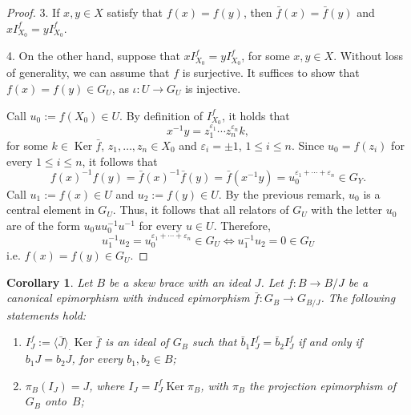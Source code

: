 \documentclass[12pt, a4paper, english]{article}
\newtheorem{corolari}[teorema]{Corollary}
\theoremstyle{definition}
\theoremstyle{remark}
\DeclareMathOperator{\Ker}{Ker}
\newcommand{\bigcdot}{\boldsymbol{\cdot}}
\begin{document}
\begin{proof}
3. If $x, y\in X$ satisfy that $f(x) = f(y)$, then $\bar{f}(x) = \bar{f}(y)$ and $xI^f_{X_0} = yI^f_{X_0}$. 

4. On the other hand, suppose that $xI^f_{X_0} = yI^f_{X_0}$, for some $x,y\in X$. Without loss of generality, we can assume that $f$ is surjective. It suffices to show that $f(x) = f(y) \in G_U$, as $\iota \colon U \rightarrow G_U$ is injective.

Call $u_0:= f(X_0) \in U$. By definition of $I^f_{X_0}$, it holds that
\[ x^{-1}y = z_1^{\varepsilon_1}\cdots z_n^{\varepsilon_n}k,\]
for some $k\in \Ker \bar{f}$, $z_1, \ldots, z_n \in X_0$ and $\varepsilon_i = \pm 1$, $1\leq i \leq n$. Since $u_0 = f(z_i)$ for every $1\leq i \leq n$, it follows that 
\[ f(x)^{-1}f(y) = \bar{f}(x)^{-1}\bar{f}(y) = \bar{f}(x^{-1}y) = u_0^{\varepsilon_1+\cdots + \varepsilon_n} \in G_Y.\]
Call $u_1 := f(x) \in U$ and $u_2 := f(y)\in U$. By the previous remark, $u_0$ is a central element in $G_U$. Thus, it follows that all relators of $G_U$ with the letter $u_0$ are of the form $u_0uu_0^{-1}u^{-1}$ for every $u\in U$. Therefore, 
\[ u_1^{-1}u_2 = u_0^{\varepsilon_1+ \cdots + \varepsilon_n} \in G_U \Leftrightarrow u_1^{-1}u_2 = 0\in G_U\]
i.e. $f(x) = f(y) \in G_U$.
\end{proof}

\begin{corolari}
\label{cor:I_J-ideal-brace}
Let $B$ be a skew brace with an ideal $J$. Let $f\colon B \rightarrow B/J$ be a canonical epimorphism with induced epimorphism $\bar{f}\colon G_B \rightarrow G_{B/J}$. The following statements hold:
\begin{enumerate}
\item $I_J^f:= \langle \bar{J} \rangle_{\bigcdot}\Ker \bar f$ is an ideal of $G_B$ such that $\bar b_1 I_J^f = \bar b_2 I_J^f$ if and only if $b_1J = b_2J$, for every $b_1,b_2\in B$;

\item $\pi_B(I_J) = J$, where $I_J = I_J^f\Ker \pi_B$, with $\pi_B$ the projection epimorphism of $G_B$ onto~$B$;
\end{enumerate}
\end{corolari}
\end{document}
